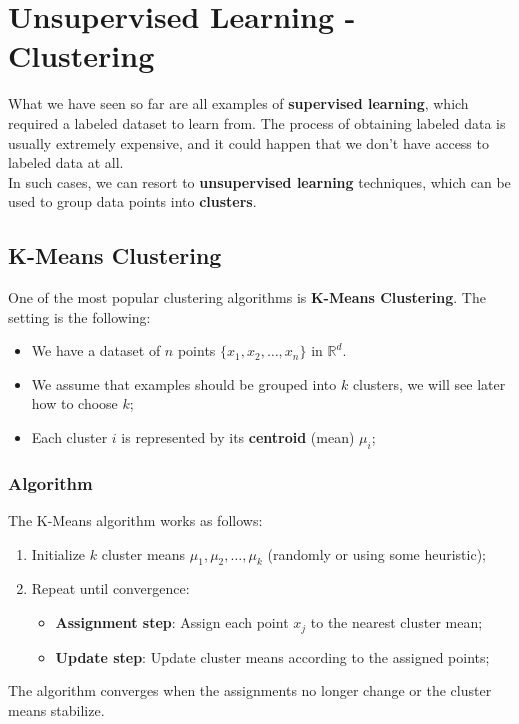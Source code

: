 \section{Unsupervised Learning - Clustering}
What we have seen so far are all examples of \textbf{supervised learning}, which required a labeled dataset to learn from.
The process of obtaining labeled data is usually extremely expensive, and it could happen that we 
don't have access to labeled data at all.
\\In such cases, we can resort to \textbf{unsupervised learning} techniques, 
which can be used to group data points into \textbf{clusters}. 

\subsection{K-Means Clustering}
One of the most popular clustering algorithms is \textbf{K-Means Clustering}. The setting is the following:
\begin{itemize}
    \item We have a dataset of $n$ points $\{x_1, x_2, \ldots, x_n\}$ in $\mathbb{R}^d$.
    \item We assume that examples should be grouped into $k$ clusters, we will see later how to choose $k$;
    \item Each cluster $i$ is represented by its \textbf{centroid} (mean) $\mu_i$;
\end{itemize}
\subsubsection*{Algorithm}
The K-Means algorithm works as follows:
\begin{enumerate}
    \item Initialize $k$ cluster means $\mu_1, \mu_2, \ldots, \mu_k$ (randomly or using some heuristic);
    \item Repeat until convergence:
    \begin{itemize}
        \item \textbf{Assignment step}: Assign each point $x_j$ to the nearest cluster mean;
        \item \textbf{Update step}: Update cluster means according to the assigned points;
    \end{itemize}
\end{enumerate}
The algorithm converges when the assignments no longer change or the cluster means stabilize. 
